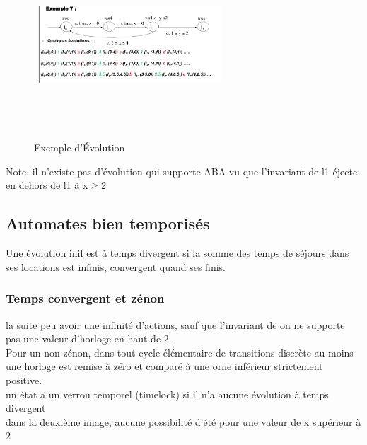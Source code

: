 \documentclass[oneside]{book}
\begin{document}
    \begin{figure}[!ht]
    	\centering
    	\includegraphics[width = 7cm, height = 7cm, keepaspectratio]{Images/exemple_evolution.png}
    	\caption{Exemple d'Évolution}
    	\label{fig:ExempleEvolution}
    \end{figure}
    
    Note, il n'existe pas d'évolution qui supporte ABA vu que l'invariant de l1 éjecte en dehors de l1 à x$\geq$2\\
    
    \subsection{Automates bien temporisés}
    
    Une évolution inif est à temps divergent si la somme des temps de séjours dans ses locations est infinis, convergent quand ses finis.\\
    
    \subsubsection{Temps convergent et zénon}
    
    la suite peu avoir une infinité d'actions, sauf que l'invariant de on ne supporte pas une valeur d'horloge en haut de 2.\\
    
    Pour un non-zénon, dans tout cycle élémentaire de transitions discrète au moins une horloge est remise à zéro et comparé à une orne inférieur strictement positive.\\
    
    
    un état a un verrou temporel (timelock) si il n'a aucune évolution à temps divergent \\
    
    dans la deuxième image, aucune possibilité d'été pour une valeur de x supérieur à 2\\
    
\end{document}
